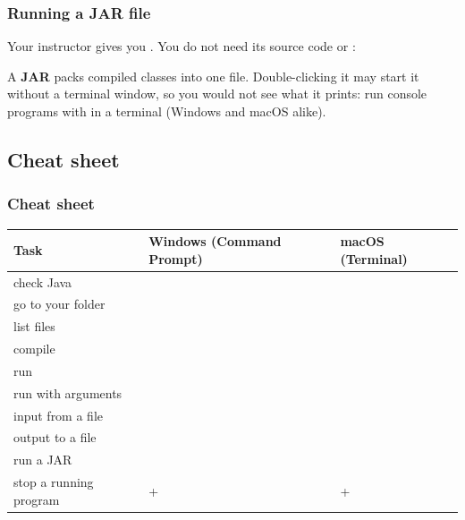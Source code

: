 \documentclass[aspectratio=169,10pt,compress]{beamer}
\begin{document}
\begin{frame}[t,fragile] \frametitle{Running a JAR file}
  \small Your instructor gives you . You do not need its source code or :


  \vspace{0.1em}
  \small A \textbf{JAR} packs compiled classes into one file. Double-clicking it may start it without a terminal window,
  so you would not see what it prints: run console programs with  in a terminal (Windows and macOS alike).
\end{frame}


\subsection[Cheat sheet]{Cheat sheet}




\begin{frame}[t,fragile] \frametitle{Cheat sheet}
  \footnotesize
  \begin{tabular}{@{}L{0.3\textwidth}L{0.31\textwidth}L{0.31\textwidth}@{}}
    \toprule
    \textbf{Task}                & \textbf{Windows (Command Prompt)} & \textbf{macOS (Terminal)} \\
    \midrule
    check Java                   &             &  \\
    go to your folder            &  &  \\
    list files                   &                       &  \\
    compile                      &          &  \\
    run                          &                &  \\
    run with arguments           &             &  \\
    input from a file            &  &  \\
    output to a file             &      &  \\
    run a JAR                    &        &  \\
    stop a running program       & +          & + \\
    \bottomrule
  \end{tabular}
\end{frame}
\end{document}
